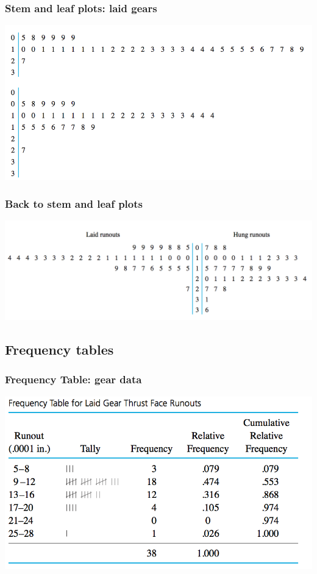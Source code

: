\documentclass[handout]{beamer}
\numberwithin{equation}{section}
\begin{document}
\begin{frame}
\frametitle{Stem and leaf plots: laid gears}
\begin{center}
 \includegraphics{../../fig/gearstemlaid.png}
\end{center}
\end{frame}


\begin{frame}
\frametitle{Back to stem and leaf plots}
\begin{center}
 \includegraphics{../../fig/gearstemback2back.png}
\end{center}
\end{frame}

\subsection{Frequency tables}

\begin{frame}
\frametitle{Frequency Table: gear data}
\begin{center}
 \includegraphics{../../fig/gearfreq.png}
\end{center}
\end{frame}
\end{document}

